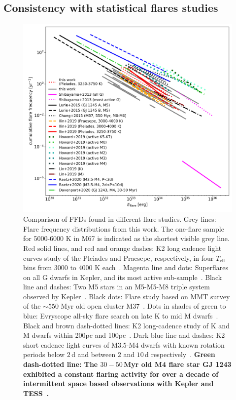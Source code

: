 \documentclass{aa}
\begin{document}
\subsection{Consistency with statistical flares studies}
\label{sec:consistency_other_work}
\begin{figure}[ht!]
    \centering
    \includegraphics[width=13.5cm]{pics/FFDs/discussion_FFDs.png}
    \caption{Comparison of FFDs found in different flare studies. Grey lines: Flare frequency distributions from this work. The one-flare sample for 5000-6000 K in M67 is indicated as the shortest visible grey line. Red solid lines, and red and orange dashes: K2 long cadence light curves study of the Pleiades and Praesepe, respectively, in four $T_\mathrm{eff}$ bins from 3000 to 4000 K each~. Magenta line and dots: Superflares on all G dwarfs in Kepler, and its most active sub-sample~\citep{shibayama2013}. Black line and dashes: Two M5 stars in an M5-M5-M8 triple system observed by Kepler~\citep{lurie2015}. Black dots: Flare study based on MMT survey of the $\sim550$ Myr old open cluster M37~\citep{chang2015}. Dots in shades of green to blue: Evryscope all-sky flare search on late K to mid M dwarfs~\citep{howard2019}. Black and brown dash-dotted lines: K2 long-cadence study of K and M dwarfs within 200pc and 100pc~\citep{lin2019}. Dark blue line and dashes: K2 short cadence light curves of M3.5-M4 dwarfs with known rotation periods below $2\,$d and between $2$ and $10\,$d respectively~\citep{raetz2020}. \textbf{Green dash-dotted line: The $30-50$\,Myr old M4 flare star GJ 1243 exhibited a constant flaring activity for over a decade of intermittent space based observations with Kepler and TESS~\citep{davenport2020arxiv}.}}          
    \label{fig:otherwork}
\end{figure}
\end{document}
